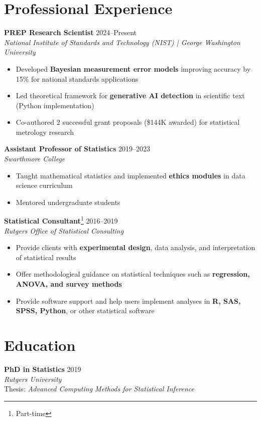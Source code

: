 \documentclass[10pt]{article}
\begin{document}
\section*{Professional Experience}
\textbf{PREP Research Scientist} \hfill 2024--Present \\ %
\textit{National Institute of Standards and Technology (NIST) | George Washington University}
\begin{itemize}[leftmargin=*,topsep=2pt,itemsep=1pt]
    \item Developed \textbf{Bayesian measurement error models} improving accuracy by 15\% for national standards applications 
    \item Led theoretical framework for \textbf{generative AI detection} in scientific text (Python implementation) 
    \item Co-authored 2 successful grant proposals (\$144K awarded) for statistical metrology research
\end{itemize}

\noindent\textbf{Assistant Professor of Statistics} \hfill 2019--2023 \\
\textit{Swarthmore College}
\begin{itemize}[leftmargin=*,topsep=2pt,itemsep=1pt]
    \item Taught mathematical statistics and implemented \textbf{ethics modules} in data science curriculum
    \item Mentored undergraduate students %
\end{itemize}

\noindent\textbf{Statistical Consultant}\footnote{Part-time} \hfill 2016--2019 \\
\textit{Rutgers Office of Statistical Consulting}
\begin{itemize}[leftmargin=*,topsep=2pt,itemsep=1pt]
    \item Provide clients with \textbf{experimental design}, data analysis, and interpretation of statistical results
    \item Offer methodological guidance on statistical techniques such as \textbf{regression, ANOVA, and survey methods}
    \item Provide software support and help users implement analyses in \textbf{R, SAS, SPSS, Python}, or other statistical software
\end{itemize}

\section*{Education}
\textbf{PhD in Statistics} \hfill 2019 \\
\textit{Rutgers University} \\
Thesis: \textit{Advanced Computing Methods for Statistical Inference} \\
\end{document}
